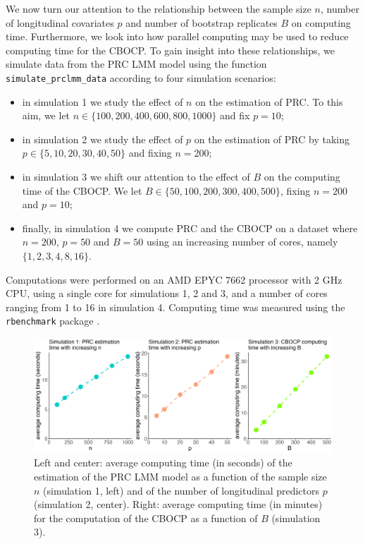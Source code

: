 We now turn our attention to the relationship between the sample size
\(n\), number of longitudinal covariates \(p\) and number of bootstrap
replicates \(B\) on computing time. Furthermore, we look into how
parallel computing may be used to reduce computing time for the CBOCP.
To gain insight into these relationships, we simulate data from the PRC
LMM model using the function \texttt{simulate\_prclmm\_data} according
to four simulation scenarios:

\begin{itemize}
\tightlist
\item
  in simulation 1 we study the effect of \(n\) on the estimation of PRC.
  To this aim, we let \(n \in \{100, 200, 400, 600, 800, 1000\}\) and
  fix \(p = 10\);
\item
  in simulation 2 we study the effect of \(p\) on the estimation of PRC
  by taking \(p \in \{5, 10, 20, 30, 40, 50\}\) and fixing \(n = 200\);
\item
  in simulation 3 we shift our attention to the effect of \(B\) on the
  computing time of the CBOCP. We let
  \(B \in \{50, 100, 200, 300, 400, 500\}\), fixing \(n = 200\) and
  \(p = 10\);
\item
  finally, in simulation 4 we compute PRC and the CBOCP on a dataset
  where \(n = 200\), \(p = 50\) and \(B = 50\) using an increasing
  number of cores, namely \(\{1, 2, 3, 4, 8, 16\}\).
\end{itemize}

Computations were performed on an AMD EPYC 7662 processor with 2 GHz
CPU, using a single core for simulations 1, 2 and 3, and a number of
cores ranging from 1 to 16 in simulation 4. Computing time was measured
using the \texttt{rbenchmark} package \citep{kusnierczyk2012}.

\begin{Schunk}
\begin{figure}[htbp]

{\centering \includegraphics[width=5.5in]{comptime_sims_123} 

}

\caption[Left and center]{Left and center: average computing time (in seconds) of the estimation of the PRC LMM model as a function of the sample size $n$ (simulation 1, left) and of the number of longitudinal predictors $p$ (simulation 2, center). Right: average computing time (in minutes) for the computation of the CBOCP as a function of $B$ (simulation 3).}\label{fig:ctime1}
\end{figure}
\end{Schunk}

